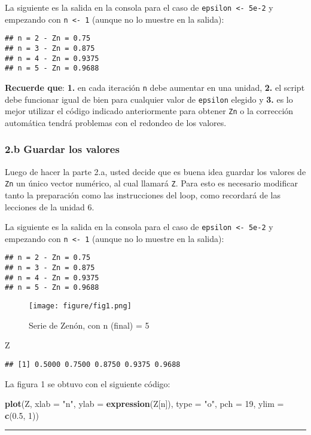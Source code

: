 \documentclass[]{article}
\makeatletter
\newenvironment{Shaded}{}{}
\newcommand{\KeywordTok}[1]{\textcolor[rgb]{0.00,0.44,0.13}{\textbf{{#1}}}}
\newcommand{\DataTypeTok}[1]{\textcolor[rgb]{0.56,0.13,0.00}{{#1}}}
\newcommand{\DecValTok}[1]{\textcolor[rgb]{0.25,0.63,0.44}{{#1}}}
\newcommand{\FloatTok}[1]{\textcolor[rgb]{0.25,0.63,0.44}{{#1}}}
\newcommand{\StringTok}[1]{\textcolor[rgb]{0.25,0.44,0.63}{{#1}}}
\newcommand{\NormalTok}[1]{{#1}}
\def\maxwidth{\ifdim\Gin@nat@width>\linewidth\linewidth
\else\Gin@nat@width\fi}
\let\Oldincludegraphics\includegraphics
\renewcommand{\includegraphics}[1]{\Oldincludegraphics[width=\maxwidth]{#1}}
\makeatother
\begin{document}
La siguiente es la salida en la consola para el caso de
\texttt{epsilon \textless{}- 5e-2} y empezando con
\texttt{n \textless{}- 1} (aunque no lo muestre en la salida):

\begin{verbatim}
## n = 2 - Zn = 0.75 
## n = 3 - Zn = 0.875 
## n = 4 - Zn = 0.9375 
## n = 5 - Zn = 0.9688
\end{verbatim}
\textbf{Recuerde que}: \textbf{1.} en cada iteración \texttt{n} debe
aumentar en una unidad, \textbf{2.} el script debe funcionar igual de
bien para cualquier valor de \texttt{epsilon} elegido y \textbf{3.} es
lo mejor utilizar el código indicado anteriormente para obtener
\texttt{Zn} o la corrección automática tendrá problemas con el redondeo
de los valores.

\subsubsection{2.b Guardar los valores}

Luego de hacer la parte 2.a, usted decide que es buena idea guardar los
valores de \texttt{Zn} un único vector numérico, al cual llamará
\texttt{Z}. Para esto es necesario modificar tanto la preparación como
las instrucciones del loop, como recordará de las lecciones de la unidad
6.

La siguiente es la salida en la consola para el caso de
\texttt{epsilon \textless{}- 5e-2} y empezando con
\texttt{n \textless{}- 1} (aunque no lo muestre en la salida):

\begin{verbatim}
## n = 2 - Zn = 0.75 
## n = 3 - Zn = 0.875 
## n = 4 - Zn = 0.9375 
## n = 5 - Zn = 0.9688
\end{verbatim}
\begin{figure}[htbp]
\centering
\texttt{[image: figure/fig1.png]}
\caption{Serie de Zenón, con n (final) = 5}
\end{figure}

\begin{Shaded}
\begin{Highlighting}[]
\NormalTok{Z}
\end{Highlighting}
\end{Shaded}
\begin{verbatim}
## [1] 0.5000 0.7500 0.8750 0.9375 0.9688
\end{verbatim}
La figura 1 se obtuvo con el siguiente código:

\begin{Shaded}
\begin{Highlighting}[]
\KeywordTok{plot}\NormalTok{(Z, }\DataTypeTok{xlab =} \StringTok{"n"}\NormalTok{, }\DataTypeTok{ylab =} \KeywordTok{expression}\NormalTok{(Z[n]), }\DataTypeTok{type =} \StringTok{"o"}\NormalTok{, }\DataTypeTok{pch =} \DecValTok{19}\NormalTok{, }\DataTypeTok{ylim =} \KeywordTok{c}\NormalTok{(}\FloatTok{0.5}\NormalTok{, }
    \DecValTok{1}\NormalTok{))}
\end{Highlighting}
\end{Shaded}
\begin{center}\rule{3in}{0.4pt}\end{center}
\end{document}
